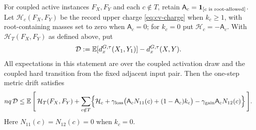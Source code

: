 \begin{lemma}\label{lem:cv-drift-decomposition}
For coupled active instances $F_X,F_Y$ and each \(c\notin T\), retain
$\mathsf A_c=\mathbf{1}_{\left[c\text{ is root-allowed}\right]}$.  Let
$\mathcal H_c(F_X,F_Y)$ be the record upper charge
\eqref{eq:cv-charge} when $k_c\ge1$, with root-containing masses set to
zero when $\mathsf A_c=0$; for $k_c=0$ put
$\mathcal H_c=-\mathsf A_c$.  With \(\mathcal H_T(F_X,F_Y)\) as defined
above, put
\[
  \mathcal D:=\operatorname{\mathbb{E}}[d_x^{G,\tau}(X_1,Y_1)]-d_x^{G,\tau}(X,Y).
\]
All expectations in this statement are over the coupled activation draw
and the coupled hard transition from the fixed adjacent input pair.
Then the one-step metric drift satisfies
\begin{equation}\label{eq:cv-drift-by-colour}
\begin{aligned}
 nq\,\mathcal D\le
 \operatorname{\mathbb{E}}\Bigg[\,\mathcal H_T(F_X,F_Y)
  +\sum_{c\notin T}
    \Bigl\{\mathcal H_c+
      \gamma_{\rm loss}\bigl(\mathsf A_c N_{11}(c)+
                         (1-\mathsf A_c)k_c\bigr)
      -\gamma_{\rm gain}\mathsf A_c N_{12}(c)\Bigr\}\,\Bigg].
\end{aligned}
\end{equation}
Here $N_{11}(c)=N_{12}(c)=0$ when $k_c=0$.
\end{lemma}

